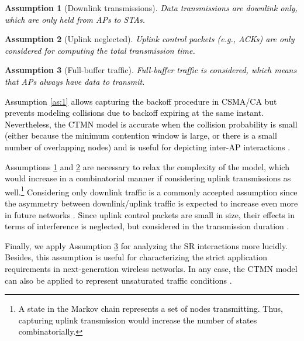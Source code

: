\documentclass[preprint,12pt]{elsarticle}
\theoremstyle{plain}
\newtheorem{assumption}{Assumption}
\begin{document}
\begin{assumption}[Downlink transmissions]\label{as:2} \textcolor{black}{Data transmissions are downlink only, which are only held from APs to STAs.} \end{assumption}

\begin{assumption}[Uplink neglected]\label{as:3} \textcolor{black}{Uplink control packets (e.g., ACKs) are only considered for computing the total transmission time.}\end{assumption}

\begin{assumption}[Full-buffer traffic]\label{as:4} \textcolor{black}{Full-buffer traffic is considered, which means that APs always have data to transmit.}\end{assumption}

\textcolor{black}{Assumption \ref{as:1} allows capturing the backoff procedure in CSMA/CA but prevents modeling collisions due to backoff expiring at the same instant. Nevertheless, the CTMN model is accurate when the collision probability is small (either because the minimum contention window is large, or there is a small number of overlapping nodes) and is useful for depicting inter-AP interactions \cite{bellalta2016throughput}.} 

\textcolor{black}{Assumptions \ref{as:2} and \ref{as:3} are necessary to relax the complexity of the model, which would increase in a combinatorial manner if considering uplink transmissions as well.\footnote{\textcolor{black}{A state in the Markov chain represents a set of nodes transmitting. Thus, capturing uplink transmission would increase the number of states combinatorially.}} Considering only downlink traffic is a commonly accepted assumption since the asymmetry between downlink/uplink traffic is expected to increase even more in future networks \cite{union2015imt}. Since uplink control packets are small in size, their effects in terms of interference is neglected, but considered in the transmission duration \cite{bellalta2016throughput,michaloliakos2016performance,liew2010back}.} 

\textcolor{black}{Finally, we apply Assumption \ref{as:4} for analyzing the SR interactions more lucidly. Besides, this assumption is useful for characterizing the strict application requirements in next-generation wireless networks. In any case, the CTMN model can also be applied to represent unsaturated traffic conditions \cite{barrachina2019overlap}.}
\end{document}
